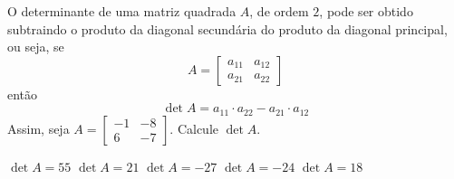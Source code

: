 O determinante de uma matriz quadrada $A$, de ordem $2$, pode ser obtido subtraindo o produto da diagonal secundária do produto da diagonal principal, ou seja, se
\[A = \left[ \begin{array}{cc}
a_{11}  &   a_{12}\\
a_{21}   & a_{22}
\end{array} \right]\]
então
\[\det A=a_{11}\cdot a_{22}-a_{21}\cdot a_{12}\]
Assim, seja $A = \left[ \begin{array}{cc}
-1  &  -8\\
6  &  -7
\end{array} \right]$. Calcule $\det A$.

$\det A=55$
$\det A=21$
$\det A=-27$
$\det A=-24$
$\det A=18$


